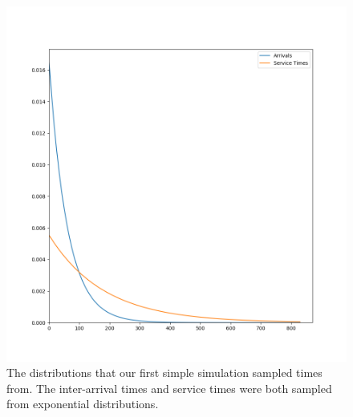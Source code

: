 \begin{figure}[h]
  \includegraphics[width=\textwidth]{figures/montecarlo/expon_expon.png}
  \caption{
    The distributions that our first simple simulation sampled times from.
    The inter-arrival times and service times were both sampled from
    exponential distributions.
  }\label{fig:simple_sim1_dists}
\end{figure}

